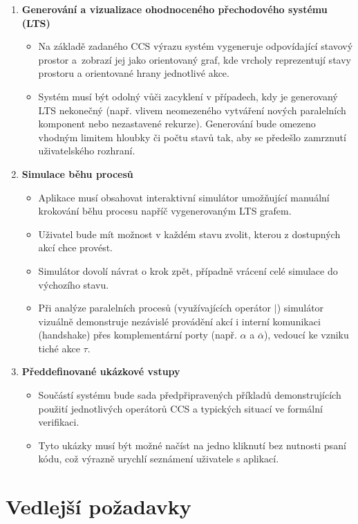 \begin{enumerate}
    \item \textbf{Generování a vizualizace ohodnoceného přechodového systému (LTS)}
    \begin{itemize}
        \item Na základě zadaného CCS výrazu systém vygeneruje odpovídající stavový prostor a~zobrazí jej jako orientovaný graf, kde vrcholy reprezentují stavy prostoru a orientované hrany jednotlivé akce.
        \item Systém musí být odolný vůči zacyklení v případech, kdy je generovaný LTS nekonečný (např. vlivem neomezeného vytváření nových paralelních komponent nebo nezastavené rekurze). Generování bude omezeno vhodným limitem hloubky či počtu stavů tak, aby se předešlo zamrznutí uživatelského rozhraní.
    \end{itemize}
    
    \item \textbf{Simulace běhu procesů}
    \begin{itemize}
        \item Aplikace musí obsahovat interaktivní simulátor umožňující manuální krokování běhu procesu napříč vygenerovaným LTS grafem.
        \item Uživatel bude mít možnost v každém stavu zvolit, kterou z dostupných akcí chce provést.
        \item Simulátor dovolí návrat o krok zpět, případně vrácení celé simulace do výchozího stavu.
        \item Při analýze paralelních procesů (využívajících operátor $|$) simulátor vizuálně demonstruje nezávislé provádění akcí i interní komunikaci (handshake) přes komplementární porty (např. $\alpha$ a $\overline{\alpha}$), vedoucí ke vzniku tiché akce $\tau$.
    \end{itemize}
    
    \item \textbf{Předdefinované ukázkové vstupy}
    \begin{itemize}
        \item Součástí systému bude sada předpřipravených příkladů demonstrujících použití jednotlivých operátorů CCS a typických situací ve formální verifikaci.
        \item Tyto ukázky musí být možné načíst na jedno kliknutí bez nutnosti psaní kódu, což výrazně urychlí seznámení uživatele s aplikací.
    \end{itemize}
\end{enumerate}

\section{Vedlejší požadavky}
\label{sec:vedlejsi_pozadavky}

